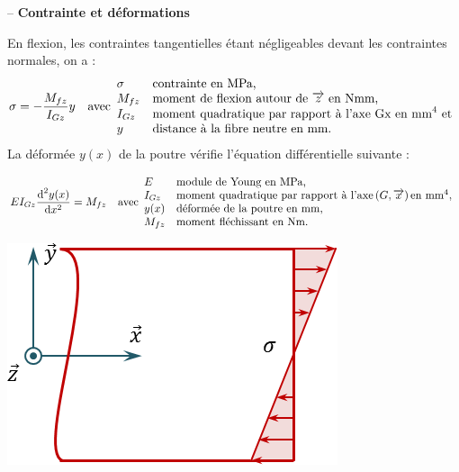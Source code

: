 \documentclass[10pt,fleqn]{article} %
\begin{document}
\begin{defi} -- 
\textbf{Contrainte et déformations} ~\\
\begin{minipage}[c]{.7\linewidth}
En flexion, les contraintes tangentielles étant négligeables devant les contraintes normales, on a : 
$$ \sigma = - \dfrac{M_{fz}}{I_{Gz}}y
\quad 
\text{avec}
\begin{array}{ll}
\sigma &\text{contrainte en \text{MPa},}\\
M_{fz} &\text{moment de flexion autour de $\overrightarrow{z_{}}$ en Nmm,} \\
I_{Gz} &\text{moment quadratique par rapport à l'axe Gx en mm}^4 \text{ et} \\
y &\text{distance à la fibre neutre en mm.}
\end{array}
$$
La déformée $y(x)$ de la poutre vérifie l'équation différentielle suivante :

$$
EI_{Gz}\dfrac{\text{d}^2 y(x) }{\text{d} x^2} = M_{fz}
\quad 
\text{avec}
\begin{array}{ll}
E &\text{module de Young en MPa,}\\
I_{Gz} &\text{moment quadratique par rapport à l'axe} \left(G,\overrightarrow{x} \right) \text{en mm}^4, \\
y(x) &\text{déformée de la poutre en mm,} \\
M_{fz} &\text{moment fléchissant en Nm.} \\
\end{array}
$$

\end{minipage} \hfill
\begin{minipage}[c]{.25\linewidth}
\begin{center}
\includegraphics[width=.9\linewidth]{images/contrainte_flexion}
\end{center}
\end{minipage}
\end{defi}
\end{document}
